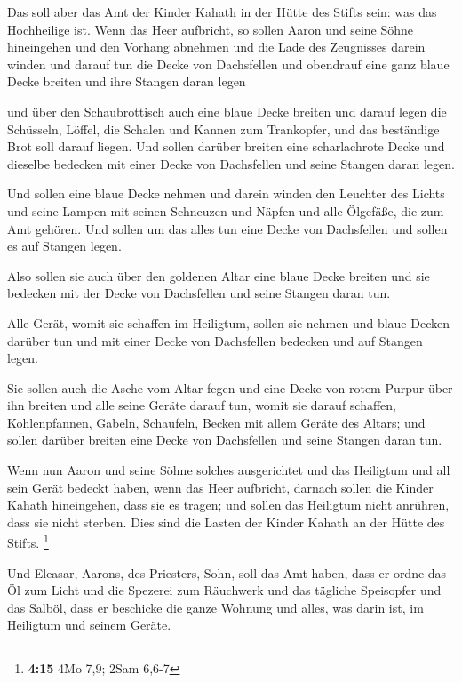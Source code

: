  Das soll aber das Amt der Kinder Kahath in der Hütte des
Stifts sein: was das Hochheilige ist.  Wenn das Heer
aufbricht, so sollen Aaron und seine Söhne hineingehen und den Vorhang
abnehmen und die Lade des Zeugnisses darein winden  und
darauf tun die Decke von Dachsfellen und obendrauf eine ganz blaue Decke
breiten und ihre Stangen daran legen

 und über den Schaubrottisch auch eine blaue Decke breiten
und darauf legen die Schüsseln, Löffel, die Schalen und Kannen zum
Trankopfer, und das beständige Brot soll darauf liegen.  Und
sollen darüber breiten eine scharlachrote Decke und dieselbe bedecken
mit einer Decke von Dachsfellen und seine Stangen daran legen.

 Und sollen eine blaue Decke nehmen und darein winden den
Leuchter des Lichts und seine Lampen mit seinen Schneuzen und Näpfen und
alle Ölgefäße, die zum Amt gehören.  Und sollen um das
alles tun eine Decke von Dachsfellen und sollen es auf Stangen legen.

 Also sollen sie auch über den goldenen Altar eine blaue
Decke breiten und sie bedecken mit der Decke von Dachsfellen und seine
Stangen daran tun.

 Alle Gerät, womit sie schaffen im Heiligtum, sollen sie
nehmen und blaue Decken darüber tun und mit einer Decke von Dachsfellen
bedecken und auf Stangen legen.

 Sie sollen auch die Asche vom Altar fegen und eine Decke
von rotem Purpur über ihn breiten  und alle seine Geräte
darauf tun, womit sie darauf schaffen, Kohlenpfannen, Gabeln, Schaufeln,
Becken mit allem Geräte des Altars; und sollen darüber breiten eine
Decke von Dachsfellen und seine Stangen daran tun.

 Wenn nun Aaron und seine Söhne solches ausgerichtet und
das Heiligtum und all sein Gerät bedeckt haben, wenn das Heer aufbricht,
darnach sollen die Kinder Kahath hineingehen, dass sie es tragen; und
sollen das Heiligtum nicht anrühren, dass sie nicht sterben. Dies sind
die Lasten der Kinder Kahath an der Hütte des Stifts. \footnote{\textbf{4:15}
  4Mo 7,9; 2Sam 6,6-7}

 Und Eleasar, Aarons, des Priesters, Sohn, soll das Amt
haben, dass er ordne das Öl zum Licht und die Spezerei zum Räuchwerk und
das tägliche Speisopfer und das Salböl, dass er beschicke die ganze
Wohnung und alles, was darin ist, im Heiligtum und seinem Geräte.


